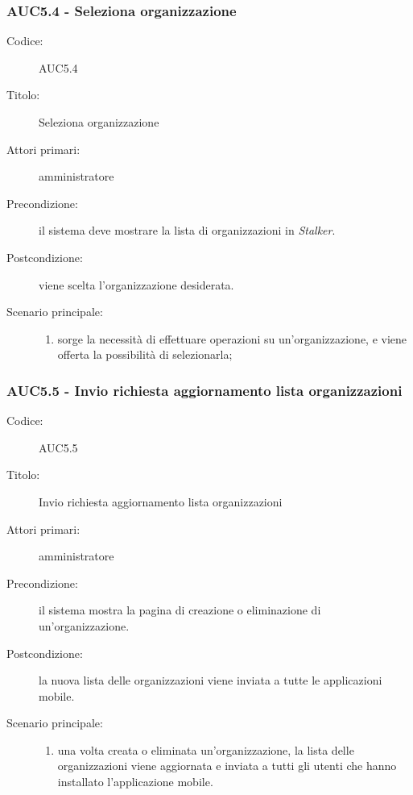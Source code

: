 \documentclass[../analisi-dei-requisiti.tex]{subfiles}
\begin{document}
\subsubsection{AUC5.4 - Seleziona organizzazione}%
\label{subsub:AUC5.4}
\begin{description}
  \item[Codice:] AUC5.4
  \item[Titolo:] Seleziona organizzazione
  \item[Attori primari:] amministratore
  \item[Precondizione:] il sistema deve mostrare la lista di organizzazioni in \emph{Stalker}.
  \item[Postcondizione:] viene scelta l'organizzazione desiderata.
  \item[Scenario principale:]
  \begin{enumerate}
    \item sorge la necessità di effettuare operazioni su un'organizzazione, e viene offerta la possibilità di selezionarla;
  \end{enumerate}
\end{description}

\subsubsection{AUC5.5 - Invio richiesta aggiornamento lista organizzazioni}%
\label{subsub:AUC5.5}
\begin{description}
  \item[Codice:] AUC5.5
  \item[Titolo:] Invio richiesta aggiornamento lista organizzazioni
  \item[Attori primari:] amministratore
  \item[Precondizione:] il sistema mostra la pagina di creazione o eliminazione di un'organizzazione.
  \item[Postcondizione:] la nuova lista delle organizzazioni viene inviata a tutte le applicazioni mobile.
  \item[Scenario principale:]
  \begin{enumerate}
    \item una volta creata o eliminata un'organizzazione, la lista delle organizzazioni viene aggiornata e inviata a tutti gli utenti che hanno installato l'applicazione mobile.
  \end{enumerate}
\end{description}
\end{document}
